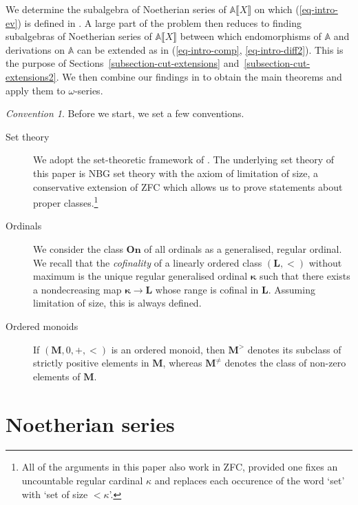 \documentclass{article}
\newcommand{\tmem}[1]{{\em #1\/}}
\newcommand{\tmmathbf}[1]{\ensuremath{\boldsymbol{#1}}}
\newenvironment{descriptioncompact}{\begin{description} }{\end{description}}
\theoremstyle{remark}\newtheorem*{convention*}{Convention}
\begin{document}
We determine the subalgebra of Noetherian series of $\mathbb{A} \llbracket X
\rrbracket$ on which (\ref{eq-intro-ev}) is defined in
. A large part of the problem then reduces to
finding subalgebras of Noetherian series of $\mathbb{A} \llbracket X
\rrbracket$ between which endomorphisms of $\mathbb{A}$ and derivations on
$\mathbb{A}$ can be extended as in (\ref{eq-intro-comp},
\ref{eq-intro-diff2}). This is the purpose of
Sections~\ref{subsection-cut-extensions} and~\ref{subsection-cut-extensions2}.
We then combine our findings in  to obtain the
main theorems and apply them to $\omega$-series.

\begin{convention*}
  Before we start, we set a few conventions.
  
  \begin{descriptioncompact}
    \item[Set theory] We adopt the set-theoretic framework of
    {\cite{BvdHK:hyp}}. The underlying set theory of this paper is NBG set
    theory with the axiom of limitation of size, a conservative extension of
    ZFC which allows us to prove statements about proper classes.\footnote{All
    of the arguments in this paper also work in ZFC, provided one fixes an
    uncountable regular cardinal $\kappa$ and replaces each occurence of the
    word `set' with `set of size $< \kappa$'.}
    
    \item[Ordinals] We consider the class $\mathbf{On}$ of all ordinals as a
    generalised, regular ordinal. We recall that the
    {\tmem{cofinality}}{} of a linearly ordered class
    $(\mathbf{L}, <)$ without maximum is the unique regular generalised
    ordinal $\tmmathbf{\kappa}$ such that there exists a nondecreasing map
    $\tmmathbf{\kappa} \longrightarrow \mathbf{L}$ whose range is cofinal in
    $\mathbf{L}$. Assuming limitation of size, this is always defined.
    
    \item[Ordered monoids] If $(\mathbf{M}, 0, +, <)$ is an ordered monoid,
    then $\mathbf{M}^{>}$\label{autolab1} denotes its subclass of strictly
    positive elements in $\mathbf{M}$, whereas
    $\mathbf{M}^{\neq}$\label{autolab2} denotes the class of non-zero elements
    of $\mathbf{M}$.
  \end{descriptioncompact}
\end{convention*}

\section{Noetherian series}\label{section-Noetherian-series}
\end{document}
